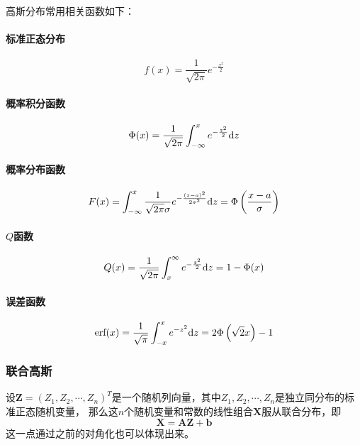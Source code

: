     高斯分布常用相关函数如下：
    \paragraph{标准正态分布}
    \begin{equation}
        f(x)=\frac{1}{\sqrt{2\pi}}e^{-\frac{x^2}{2}}
    \end{equation}
    \paragraph{概率积分函数}
    \begin{equation}
        \Phi(x)=\frac{1}{\sqrt{2\pi}}\int_{-\infty}^{x}e^{-\frac{z^2}{2}}\text{\upshape d} z
    \end{equation}
    \paragraph{概率分布函数}
    \begin{equation}
        F(x)=\int_{-\infty}^{x}\frac{1}{\sqrt{2\pi}\sigma}e^{-\frac{(z-a)^2}{2\sigma^2}}\text{\upshape d} z=\Phi\left(\frac{x-a}{\sigma}\right)
    \end{equation}
    \paragraph{$Q$函数}
    \begin{equation}
        Q(x)=\frac{1}{\sqrt{2\pi}}\int_{x}^{\infty}e^{-\frac{z^2}{2}}\text{\upshape d} z=1-\Phi(x)
    \end{equation}
    \paragraph{误差函数}
    \begin{equation}
        \text{erf}(x)=\frac{1}{\sqrt{\pi}}\int_{-x}^{x}e^{-z^2}\text{\upshape d} z=2\Phi\left(\sqrt{2}x\right)-1
    \end{equation}

    \subsubsection{联合高斯}
    设$\bm Z=(Z_1,Z_2,\cdots,Z_n)^T$是一个随机列向量，其中$Z_1,Z_2,\cdots,Z_n$是独立同分布的标准正态随机变量，
    那么这$n$个随机变量和常数的线性组合$\bm X$服从联合分布，即
    \begin{equation}
        \bm X=\bm{AZ}+\bm b
    \end{equation}
    这一点通过之前的对角化也可以体现出来。


